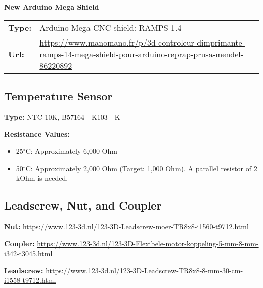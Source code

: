 \noindent
\textbf{New Arduino Mega Shield}

\begin{tabular}{@{}ll}
    \textbf{Type:} & Arduino Mega CNC shield: RAMPS 1.4  \\
    \textbf{Url:} & \url{https://www.manomano.fr/p/3d-controleur-dimprimante-ramps-14-mega-shield-pour-arduino-reprap-prusa-mendel-86220892} \\
\end{tabular}

\subsection{Temperature Sensor}

\textbf{Type:} NTC 10K, B57164 - K103 - K

\textbf{Resistance Values:}
\begin{itemize}
    \item 25$^\circ$C: Approximately 6,000 Ohm
    \item 50$^\circ$C: Approximately 2,000 Ohm (Target: 1,000 Ohm).  A parallel resistor of 2 kOhm is needed.
\end{itemize}

\subsection{Leadscrew, Nut, and Coupler}

\textbf{Nut:} \url{https://www.123-3d.nl/123-3D-Leadscrew-moer-TR8x8-i1560-t9712.html}

\textbf{Coupler:} \url{https://www.123-3d.nl/123-3D-Flexibele-motor-koppeling-5-mm-8-mm-i342-t3045.html}

\textbf{Leadscrew:} \url{https://www.123-3d.nl/123-3D-Leadscrew-TR8x8-8-mm-30-cm-i1558-t9712.html}